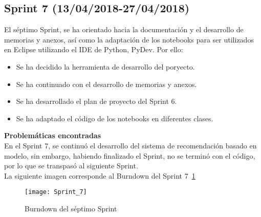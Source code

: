 \subsection{\textbf{Sprint 7} (13/04/2018-27/04/2018) }
El séptimo  Sprint, se ha orientado hacia la documentación y  el desarrollo de memorias y anexos, así como la adaptación de los notebooks para ser utilizados en Eclipse utilizando el IDE de Python, PyDev. 
Por ello: 
\begin{itemize}
\item Se ha decidido la herramienta de desarrollo del poryecto. 
\item Se ha continuado con el desarrollo de memorias y anexos. 
\item Se ha desarrollado el plan de proyecto del Sprint 6.
\item Se ha adaptado el código de los notebooks en diferentes clases. 

\end{itemize}
\textbf{Problemáticas encontradas}\\En el Sprint 7, se continuó el desarrollo del sistema de recomendación basado en modelo, sin embargo, habiendo finalizado el Sprint, no se terminó con el código, por lo que se transpasó al  siguiente Sprint. 
 \\La siguiente imagen corresponde al Burndown del Sprint 7~\ref{fig:A.2.7}
\begin{figure}[h]
\centering
\texttt{[image: Sprint\_7]}
\caption{Burndown del séptimo Sprint}
\label{fig:A.2.7}
\end{figure}
\\

